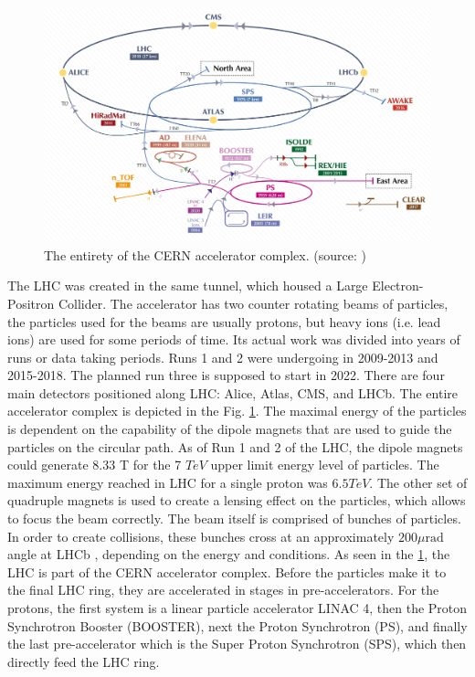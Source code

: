 \begin{figure}
  \centering
  \includegraphics[width=0.9\linewidth]{figures/chapter2/CERN_accelerator_complex.jpeg}
  \caption{The entirety of the CERN accelerator complex. (source: \cite{VandenBroeck:2693837})}
  \label{fig:cern_complex}
\end{figure}

The LHC was created in the same tunnel, which housed a Large Electron-Positron Collider.
The accelerator has two counter rotating beams of particles, the particles used for the beams are usually protons, but heavy ions (i.e. lead ions) are used for some periods of time.
Its actual work was divided into years of runs or data taking periods. Runs 1 and 2 were undergoing in 2009-2013 and 2015-2018. The planned run three is supposed to start in 2022.
There are four main detectors positioned along LHC: Alice, Atlas, CMS, and LHCb.
The entire accelerator complex is depicted in the Fig. \ref{fig:cern_complex}.
The maximal energy of the particles is dependent on the capability of the dipole magnets that are used to guide the particles on the circular path.
As of Run 1 and 2 of the LHC, the dipole magnets could generate 8.33 T  \cite{Evans_2008} for the 7 $TeV$ upper limit energy level of particles.
The maximum energy reached in LHC for a single proton was $6.5 TeV$.
The other set of quadruple magnets is used to create a lensing effect on the particles, which allows to focus the beam correctly.
The beam itself is comprised of bunches of particles.
In order to create collisions, these bunches cross at an approximately $200 \mu \text{rad}$ angle at LHCb \cite{Holzer:1541986}, depending on the energy and conditions.
As seen in the \ref{fig:cern_complex}, the LHC is part of the CERN accelerator complex.
Before the particles make it to the final LHC ring, they are accelerated in stages in pre-accelerators.
For the protons, the first system is a linear particle accelerator LINAC 4, then the Proton Synchrotron Booster (BOOSTER), next the Proton Synchrotron (PS), and finally the last pre-accelerator which is the Super Proton Synchrotron (SPS), which then directly feed the LHC ring.

